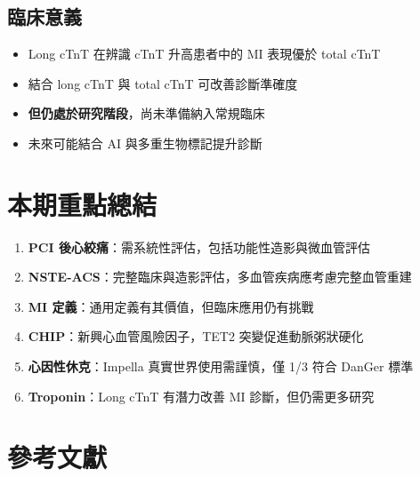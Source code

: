 \documentclass[12pt,a4paper]{article}
\begin{document}
\subsection{臨床意義}

\begin{itemize}
    \item Long cTnT 在辨識 cTnT 升高患者中的 MI 表現優於 total cTnT
    \item 結合 long cTnT 與 total cTnT 可改善診斷準確度
    \item \textbf{但仍處於研究階段}，尚未準備納入常規臨床
    \item 未來可能結合 AI 與多重生物標記提升診斷
\end{itemize}

\section{本期重點總結}

\begin{enumerate}
    \item \textbf{PCI 後心絞痛}：需系統性評估，包括功能性造影與微血管評估

    \item \textbf{NSTE-ACS}：完整臨床與造影評估，多血管疾病應考慮完整血管重建

    \item \textbf{MI 定義}：通用定義有其價值，但臨床應用仍有挑戰

    \item \textbf{CHIP}：新興心血管風險因子，TET2 突變促進動脈粥狀硬化

    \item \textbf{心因性休克}：Impella 真實世界使用需謹慎，僅 1/3 符合 DanGer 標準

    \item \textbf{Troponin}：Long cTnT 有潛力改善 MI 診斷，但仍需更多研究
\end{enumerate}

\section{參考文獻}
\end{document}
